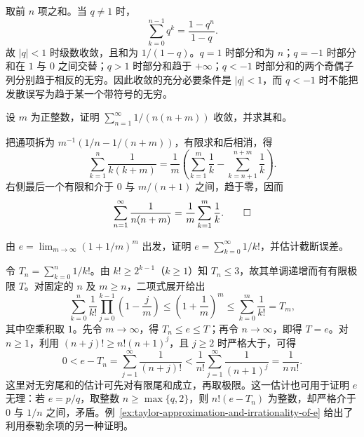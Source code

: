 \begin{solve}
取前 $n$ 项之和。当 $q\neq1$ 时，
\[
    \sum_{k=0}^{n-1}q^k=\frac{1-q^n}{1-q}.
\]
故 $|q|<1$ 时级数收敛，且和为 $1/(1-q)$。$q=1$ 时部分和为 $n$；$q=-1$ 时部分和在 $1$ 与 $0$ 之间交替；$q>1$ 时部分和趋于 $+\infty$；$q<-1$ 时部分和的两个奇偶子列分别趋于相反的无穷。因此收敛的充分必要条件是 $|q|<1$，而 $q<-1$ 时不能把发散误写为趋于某一个带符号的无穷。
\end{solve}

\begin{example}
\label{ex:telescoping-shifted-harmonic-series}
设 $m$ 为正整数，证明 $\sum_{n=1}^{\infty}1/(n(n+m))$ 收敛，并求其和。
\end{example}

\begin{solve}
把通项拆为 $m^{-1}(1/n-1/(n+m))$，有限求和后相消，得
\[
    \sum_{k=1}^{n}\frac1{k(k+m)}
    =\frac1m\left(\sum_{k=1}^{m}\frac1k
                     -\sum_{k=n+1}^{n+m}\frac1k\right).
\]
右侧最后一个有限和介于 $0$ 与 $m/(n+1)$ 之间，趋于零，因而
\[
    \sum_{n=1}^{\infty}\frac1{n(n+m)}=\frac1m\sum_{k=1}^{m}\frac1k.
    \qedhere
\]
\end{solve}

\begin{example}
\label{ex:factorial-series-for-e}
由 $e=\lim_{m\to\infty}(1+1/m)^m$ 出发，证明 $e=\sum_{k=0}^{\infty}1/k!$，并估计截断误差。
\end{example}

\begin{solve}
令 $T_n=\sum_{k=0}^n1/k!$。由 $k!\geq2^{k-1}$（$k\geq1$）知 $T_n\leq3$，故其单调递增而有有限极限 $T$。对固定的 $n$ 及 $m\geq n$，二项式展开给出
\[
    \sum_{k=0}^n\frac1{k!}
       \prod_{j=0}^{k-1}\left(1-\frac jm\right)
    \leq\left(1+\frac1m\right)^m
    \leq\sum_{k=0}^m\frac1{k!}=T_m,
\]
其中空乘积取 $1$。先令 $m\to\infty$，得 $T_n\leq e\leq T$；再令 $n\to\infty$，即得 $T=e$。对 $n\geq1$，利用 $(n+j)!\geq n!(n+1)^j$，且 $j\geq2$ 时严格大于，可得
\begin{equation}
    0<e-T_n=\sum_{j=1}^{\infty}\frac1{(n+j)!}
      <\frac1{n!}\sum_{j=1}^{\infty}\frac1{(n+1)^j}
      =\frac1{n\,n!}.
    \label{eq:factorial-series-tail-bound}
\end{equation}
这里对无穷尾和的估计可先对有限尾和成立，再取极限。这一估计也可用于证明 $e$ 无理：若 $e=p/q$，取整数 $n\geq\max\{q,2\}$，则 $n!(e-T_n)$ 为整数，却严格介于 $0$ 与 $1/n$ 之间，矛盾。例~\ref{ex:taylor-approximation-and-irrationality-of-e} 给出了利用泰勒余项的另一种证明。
\end{solve}

